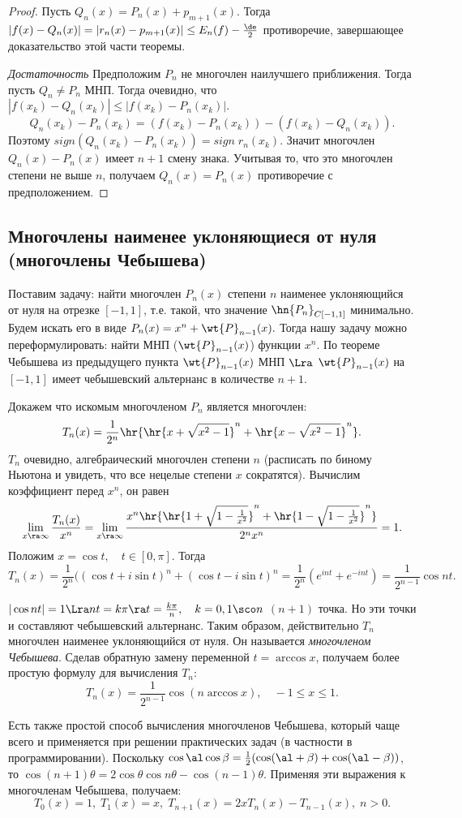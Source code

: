 \documentclass{article}
\begin{document}
\begin{proof}
  Пусть $Q_n(x)=P_n(x)+p_{m+1}(x)$. Тогда
  $|f(x)-Q_n(x)|=|r_n(x)-p_{m+1}(x)|\le E_n(f)-\frac{\de}2$ противоречие, завершающее доказательство этой части теоремы.

  \emph{Достаточность} Предположим $P_n$ не многочлен наилучшего
  приближения. Тогда пусть $Q_n\neq P_n$ МНП. Тогда очевидно, что
  $|f(x_k)-Q_n(x_k)|\le|f(x_k)-P_n(x_k)|.$
  $$Q_n(x_k)-P_n(x_k)=(f(x_k)-P_n(x_k))-(f(x_k)-Q_n(x_k)).$$
  Поэтому $sign(Q_n(x_k)-P_n(x_k))=sign\; r_n(x_k)$. Значит
  многочлен $Q_n(x)-P_n(x)$ имеет $n+1$ смену знака. Учитывая то,
  что это многочлен степени не выше $n$, получаем $Q_n(x)=P_n(x)$ противоречие с предположением.
\end{proof}

\subsection{Многочлены наименее уклоняющиеся от нуля (многочлены Чебышева)}
Поставим задачу: найти многочлен $P_n(x)$ степени $n$ наименее
уклоняющийся от нуля на отрезке $[-1,1]$, т.е. такой, что значение
$\hn{P_n}_{C[-1,1]}$ минимально. Будем искать его в виде
$P_n(x)=x^n+\wt{P}_{n-1}(x).$ Тогда нашу задачу можно
переформулировать: найти МНП ($\wt{P}_{n-1}(x)$) функции
$x^n$. По теореме Чебышева из предыдущего пункта
$\wt{P}_{n-1}(x)$ МНП $\Lra$
$\wt{P}_{n-1}(x)$ на $[-1,1]$ имеет чебышевский альтернанс
в количестве $n+1$.

Докажем что искомым многочленом $P_n$ является многочлен:
$$T_n(x)=\frac1{2^n}\hr{\hr{x+\sqrt{x^2-1}}^n+\hr{x-\sqrt{x^2-1}}^n}.$$
$T_n$ очевидно, алгебраический многочлен степени $n$ (расписать
по биному Ньютона и увидеть, что все нецелые степени $x$
сократятся). Вычислим коэффициент перед $x^n$, он равен
$$\lim_{x\ra\infty}\frac{T_n(x)}{x^n}=\lim_{x\ra\infty}\frac{x^n\hr{\hr{1+\sqrt{1-\frac1{x^2}}}^n+\hr{1-\sqrt{1-\frac1{x^2}}}^n}}{2^nx^n}=1.$$
Положим $x=\cos t,\quad t\in[0,\pi]$. Тогда
$$T_n(x)=\frac1{2^n}((\cos t+i\sin t)^n+(\cos t-i\sin
t)^n=\frac1{2^n}(e^{int}+e^{-int})=\frac1{2^{n-1}}\cos nt.$$

$|\cos nt|=1\Lra nt=k\pi\ra t=\frac{k\pi}n,\quad k=0,1\sco n$ $(n+1)$ точка. Но эти
точки и составляют чебышевский альтернанс. Таким образом, действительно $T_n$ многочлен наименее
уклоняющийся от нуля. Он называется \emph{многочленом Чебышева}. Сделав обратную замену переменной $t=\arccos
x$, получаем более простую формулу для вычисления $T_n$:
$$T_n(x)=\frac1{2^{n-1}}\cos(n\arccos x),\quad -1\le x\le1.$$

Есть также простой способ вычисления многочленов Чебышева, который
чаще всего и применяется при решении практических задач (в
частности в программировании). Поскольку
$\cos\al\cos\beta=\frac12(\cos(\al+\beta)+\cos(\al-\beta))$,
то $\cos(n+1)\theta=2\cos\theta\cos n\theta-\cos(n-1)\theta.$
Применяя эти выражения к многочленам Чебышева, получаем:
$$T_0(x)=1,\;T_1(x)=x,\;T_{n+1}(x)=2xT_n(x)-T_{n-1}(x),\;n>0.$$
\end{document}
